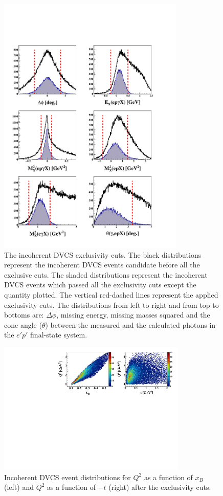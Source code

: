 \documentclass[twocolumn,nofootinbib,showpacs,prl,superscriptaddress,secnumarabic,amssymb,nobibnotes,aps,floatfix]{revtex4}
\begin{document}
\begin{figure}[tb]
\includegraphics[width=8.9cm]{figs/incoh_exc_cuts_final.pdf}
\caption{The incoherent DVCS exclusivity cuts. The black distributions 
   represent the incoherent DVCS events candidate before all the exclusive 
   cuts. The shaded distributions represent the incoherent DVCS events which 
   passed all the exclusivity cuts except the quantity plotted. The vertical 
   red-dashed lines represent the applied exclusivity cuts. The distributions 
   from left to right and from top to bottoms are: $\Delta \phi$, missing 
   energy, missing masses squared and the cone angle ($\theta$) between the 
   measured and the calculated photons in the $e'p'$ final-state system. }
\label{fig:kin-cuts}

\end{figure}
\begin{figure}[h!]
\hspace{-0.45cm}
\includegraphics[width=9.0cm]{figs/Q2_xB_t_InCoh.pdf}
\caption{Incoherent DVCS event distributions for $Q^{2}$ as a function of 
$x_{B}$ (left) and $Q^{2}$ as a function of $-t$ (right) after the exclusivity 
cuts.}
\label{fig:kin-coverage}
\end{figure}
\end{document}
